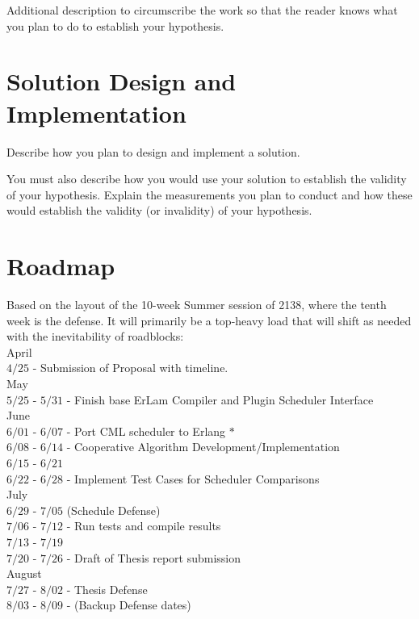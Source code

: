 Additional description to circumscribe the work so that the reader
knows what you plan to do to establish your hypothesis.

\section{Solution Design and Implementation}
Describe how you plan to design and implement a solution. 

You must also describe how you would use your solution to establish the validity of your hypothesis. Explain the measurements you plan to conduct and how these would establish the validity (or invalidity) of your hypothesis.

\section{Roadmap}

Based on the layout of the 10-week Summer session of 2138, where the tenth week
is the defense. It will primarily be a top-heavy load that will shift as needed
with the inevitability of roadblocks:\\

    April\\
        $4/25$ - Submission of Proposal with timeline.\\

    May\\
        $5/25$ - $5/31$ - Finish base ErLam Compiler and Plugin Scheduler Interface \\

    June \\
        $6/01$ - $6/07$ - Port CML scheduler to Erlang $*$\\
        $6/08$ - $6/14$ - Cooperative Algorithm Development/Implementation \\
        $6/15$ - $6/21$  \\
        $6/22$ - $6/28$ - Implement Test Cases for Scheduler Comparisons\\

    July\\
        $6/29$ - $7/05$ (Schedule Defense)\\
        $7/06$ - $7/12$ - Run tests and compile results\\
        $7/13$ - $7/19$ \\
        $7/20$ - $7/26$ - Draft of Thesis report submission\\

    August\\
        $7/27$ - $8/02$ - Thesis Defense\\
        $8/03$ - $8/09$ -   (Backup Defense dates)\\


